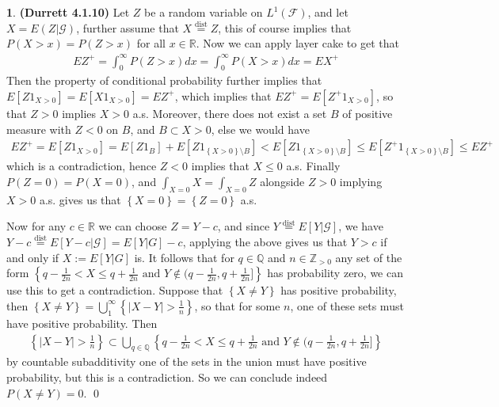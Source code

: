 \documentclass{article}
\theoremstyle{definition}
\newtheorem{pb}{}
\newcommand{\set}[1]{\left\{#1\right\}}
\newcommand{\abs}[1]{\left\vert#1\right\vert}
\newcommand{\tand}{\text{ and }}
\begin{document}
    \begin{pb}\textbf{(Durrett 4.1.10)}
        Let \(Z\) be a random variable on \(L^1(\mathcal{F})\), and let \(X = E(Z|\mathcal{G})\), further assume that \(X \overset{\text{dist}}{=} Z\), this of course implies that \(P(X > x) = P(Z > x)\) for all \(x \in \mathbb{R}\).  Now we can apply layer cake to get that
        \begin{align*}
            EZ^+ = \int_0^\infty P(Z>x)dx = \int_0^\infty P(X>x)dx = EX^+
        \end{align*}
        Then the property of conditional probability further implies that \(E[Z1_{X>0}] = E[X1_{X > 0}] = EZ^+\), which implies that \(EZ^+ = E[Z^+1_{X>0}]\), so that \(Z > 0\) implies \(X > 0\) a.s. Moreover, there does not exist a set \(B\) of positive measure with \(Z < 0\) on \(B\), and \(B \subset {X>0}\), else we would have
        \begin{align*}
            EZ^+ = E[Z1_{X>0}] = E[Z1_{B}] + E[Z1_{\set{X>0}\setminus B}] < E[Z1_{\set{X>0}\setminus B}] \leq E[Z^+1_{\set{X>0}\setminus B}] \leq EZ^+
        \end{align*}
        which is a contradiction, hence \(Z < 0\) implies that \(X \leq 0\) a.s. Finally \(P(Z = 0) = P(X = 0)\), and \(\int_{X = 0}X = \int_{X = 0} Z\) alongside \(Z > 0\) implying \(X > 0\) a.s. gives us that \(\set{X = 0} = \set{Z = 0}\) a.s.

        Now for any \(c \in \mathbb{R}\) we can choose \(Z = Y-c\), and since \(Y \overset{\text{dist}}{=} E[Y| \mathcal{G}]\), we have \(Y - c \overset{\text{dist}}{=} E[Y-c| \mathcal{G}] = E[Y|G] - c\), applying the above gives us that \(Y > c\) if and only if \(X := E[Y|G]\) is. It follows that for \(q \in \mathbb{Q}\) and \(n \in \mathbb{Z}_{>0}\) any set of the form \(\set{q - \frac{1}{2n} < X \leq q + \frac{1}{2n} \tand Y \not \in (q-\frac{1}{2n},q+\frac{1}{2n}]}\) has probability zero, we can use this to get a contradiction. Suppose that \(\set{X \neq Y}\) has positive probability, then \(\set{X \neq Y} = \bigcup_1^\infty \set{\abs{X - Y} > \frac{1}{n}}\), so that for some \(n\), one of these sets must have positive probability. Then
        \begin{align*}
            \set{\abs{X - Y} > \frac{1}{n}} \subset \bigcup_{q \in \mathbb{Q}}\set{q - \frac{1}{2n} < X \leq q + \frac{1}{2n} \tand Y \not \in (q-\frac{1}{2n},q+\frac{1}{2n}]}
        \end{align*}
        by countable subadditivity one of the sets in the union must have positive probability, but this is a contradiction. So we can conclude indeed \(P(X \neq Y) = 0\). \qed
    \end{pb}
\end{document}
